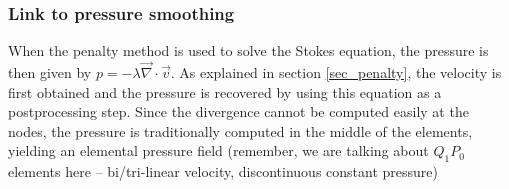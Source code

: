 \subsubsection{Link to pressure smoothing}

When the penalty method is used to solve the Stokes equation, the pressure
is then given by $p=-\lambda \vec\nabla \cdot \vec v$. As explained in 
section \ref{sec_penalty}, the velocity is first obtained and the pressure 
is recovered by using this equation as a postprocessing step. Since the divergence 
cannot be computed easily at the nodes, the pressure is traditionally computed 
in the middle of the elements, yielding an elemental pressure field (remember, 
we are talking about $Q_1P_0$ elements here -- bi/tri-linear velocity, discontinuous
constant pressure)




